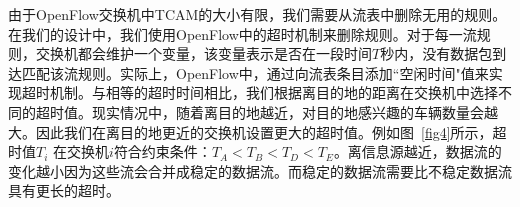
由于OpenFlow交换机中TCAM的大小有限，我们需要从流表中删除无用的规则。在我们的设计中，我们使用OpenFlow中的超时机制来删除规则。对于每一流规则，交换机都会维护一个变量，该变量表示是否在一段时间$T$秒内，没有数据包到达匹配该流规则。实际上，OpenFlow中，通过向流表条目添加``空闲时间"值来实现超时机制。与相等的超时时间相比，我们根据离目的地的距离在交换机中选择不同的超时值。现实情况中，随着离目的地越近，对目的地感兴趣的车辆数量会越大。因此我们在离目的地更近的交换机设置更大的超时值。例如图~\ref{fig4}所示，超时值$T_{i}$ 在交换机$i$符合约束条件：$ T_{A} < T_{B} < T_{D} < T_{E}$。离信息源越近，数据流的变化越小因为这些流会合并成稳定的数据流。而稳定的数据流需要比不稳定数据流具有更长的超时。

